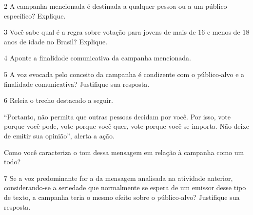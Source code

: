 
\num{2} A campanha mencionada é destinada a qualquer pessoa ou a um
público específico? Explique.


\num{3} Você sabe qual é a regra sobre votação para jovens de mais de 16 e menos de 18 anos de idade no Brasil? Explique.


\num{4} Aponte a finalidade comunicativa da campanha mencionada.


\num{5} A voz evocada pelo conceito da campanha é condizente com o
público-alvo e a finalidade comunicativa? Justifique sua resposta.


\pagebreak

\num{6} Releia o trecho destacado a seguir.

\begin{myquote}
``Portanto, não permita que outras pessoas decidam por você. Por isso,
vote porque você pode, vote porque você quer, vote porque você se
importa. Não deixe de emitir sua opinião'', alerta a ação.
\end{myquote}

Como você caracteriza o tom dessa mensagem em relação à campanha como um
todo?


\num{7} Se a voz predominante for a da mensagem analisada na atividade
anterior, considerando-se a seriedade que normalmente se espera de um emissor desse tipo de texto, a campanha teria o mesmo efeito sobre o público-alvo?
Justifique sua resposta.

